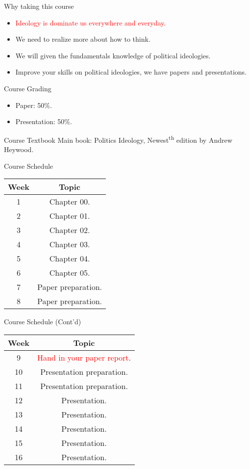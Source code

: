 \documentclass{beamer}
\begin{document}
\begin{frame}{Why taking this course}
\begin{itemize}
\pause
\item \textcolor{red}{Ideology is dominate us everywhere and everyday.}
\pause
\item We need to realize more about how to think.
\pause
\item We will given the fundamentals knowledge of political ideologies.
\pause
\item Improve your skills on political ideologies, we have papers and presentations.
\end{itemize}
\end{frame}
\begin{frame}{Course Grading}
\begin{itemize}
\pause
\item Paper: 50\%.
\vspace{1em}
\pause
\item Presentation: 50\%.
\end{itemize}
\end{frame}
\begin{frame}{Course Textbook}
\pause
Main book: Politics Ideology, Newest\textsuperscript{th} edition by Andrew Heywood. \\
\end{frame}
\begin{frame}{Course Schedule}
\begin{center}
\begin{tabular}{|c|c|}
\hline
Week & Topic \\
\hline
1 & Chapter 00.\\
\hline
2 & Chapter 01.\\
\hline
3 & Chapter 02.\\
\hline
4 & Chapter 03.\\
\hline
5 & Chapter 04.\\
\hline
6 & Chapter 05.\\
\hline
7 & Paper preparation.\\
\hline
8 & Paper preparation.\\
\hline
\end{tabular}
\end{center}
\end{frame}
\begin{frame}{Course Schedule (Cont'd)}
\begin{center}
\begin{tabular}{|c|c|}
\hline
Week & Topic \\
\hline
9 & \textcolor{red}{Hand in your paper report}.\\
\hline
10 & Presentation preparation.\\
\hline
11 & Presentation preparation.\\
\hline
12 & Presentation.\\
\hline
13 & Presentation.\\
\hline
14 & Presentation.\\
\hline
15 & Presentation.\\
\hline
16 & Presentation.\\
\hline
\end{tabular}
\end{center}
\end{frame}
\end{document}
